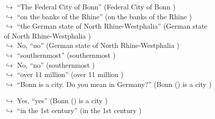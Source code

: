 \documentclass[11pt,a4paper, onecolumn]{article}
\begin{document}
\begin{figure}[t] \small \begin{tcolorbox}[boxsep=0pt,left=5pt,right=0pt,top=2pt,colback = yellow!5] \begin{dialogue}
 \small 
\colorbox{pink!25}{$\hookrightarrow$}
{ ``The Federal City of Bonn'' (Federal City of Bonn ) }
\\
\colorbox{pink!25}{$\hookrightarrow$}
{ ``on the banks of the Rhine'' (on the banks of the Rhine ) }
\\
\colorbox{pink!25}{$\hookrightarrow$}
{ ``the German state of North Rhine-Westphalia'' (German state of North Rhine-Westphalia ) }
\\
\colorbox{pink!25}{$\hookrightarrow$}
\colorbox{red!25}{No,}
{ ``no'' (German state of North Rhine-Westphalia ) }
\\
\colorbox{pink!25}{$\hookrightarrow$}
{ ``southernmost'' (southernmost ) }
\\
\colorbox{pink!25}{$\hookrightarrow$}
\colorbox{red!25}{No,}
{ ``no'' (southernmost ) }
\\
\colorbox{pink!25}{$\hookrightarrow$}
{ ``over 11 million'' (over 11 million ) }
\\
\colorbox{pink!25}{$\hookrightarrow$}
{ ``Bonn is a city. Do you mean in Germany?'' (Bonn () is a city ) }
 \end{dialogue}\end{tcolorbox}\end{figure}\begin{figure}[t] \small \begin{tcolorbox}[boxsep=0pt,left=5pt,right=0pt,top=2pt,colback = yellow!5] \begin{dialogue}
 \small 
\colorbox{pink!25}{$\hookrightarrow$}
\colorbox{red!25}{Yes,}
{ ``yes'' (Bonn () is a city ) }
\\
\colorbox{pink!25}{$\hookrightarrow$}
{ ``in the 1st century'' (in the 1st century ) }

\end{dialogue}
\end{tcolorbox}
\end{figure}
\end{document}
